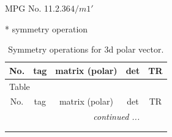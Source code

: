 \documentclass[fleqn,8pt]{jsarticle}
\begin{document}
\setcounter{MaxMatrixCols}{32}

\renewcommand{\tablename}{Table~}
\renewcommand{\figurename}{Figure~}
\begin{center}
\LARGE
MPG No. 11.2.36\quad$4/m1'$
\end{center}
* symmetry operation
\renewcommand{\arraystretch}{1.3}
\begin{longtable}{ccccc}
\caption{Symmetry operations for 3d polar vector.}
 \\
 \hline \hline
No. & tag & matrix (polar) & det & TR \\ \hline \endfirsthead

\multicolumn{4}{l}{\tablename\ \thetable{}} \\
 \hline \hline
No. & tag & matrix (polar) & det & TR \\ \hline \endhead

 \hline \hline
\multicolumn{4}{r}{\footnotesize\it continued ...} \\ \endfoot

 \hline \hline
\multicolumn{4}{r}{} \\ \endlastfoot


\end{longtable}
\end{document}
